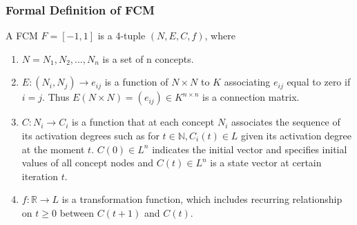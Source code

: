 \documentclass[conference]{IEEEtran}
\begin{document}
\subsubsection{Formal Definition of FCM}
A FCM \begin{math} F = [-1,1] \end{math} is a 4-tuple \begin{math} (N,E,C,f) \end{math}, where
\begin{enumerate}
\item \begin{math} N = {N_{1},N_{2},...,N_{n}} \end{math} is a set of n concepts.
\item \begin{math} E: (N_{i},N_{j}) \rightarrow e_{ij} \end{math} is a function of \begin{math} N \times N \end{math} to \begin{math} K \end{math} associating \begin{math} e_{ij} \end{math} equal to zero if \begin{math} i = j \end{math}. Thus \begin{math} E(N \times N) = (e_{ij}) \in K^{n \times n} \end{math} is a connection matrix.
\item \begin{math} C: N_{i} \rightarrow C_{i} \end{math} is a function that at each concept \begin{math} N_{i} \end{math} associates the sequence of its activation degrees such as for \begin{math} t \in \mathbb{N}, C_{i}(t) \in L \end{math} given its activation degree at the moment \begin{math} t \end{math}. \begin{math} C(0) \in L^{n} \end{math} indicates the initial vector and specifies initial values of all concept nodes and \begin{math} C(t) \in L^{n} \end{math} is a state vector at certain iteration \begin{math} t \end{math}.
\item \begin{math} f: \mathbb{R} \rightarrow L \end{math} is a transformation function, which includes recurring relationship on \begin{math} t \geqslant 0 \end{math} between \begin{math} C(t+1) \end{math} and \begin{math} C(t) \end{math}.
\end{enumerate}
\end{document}
